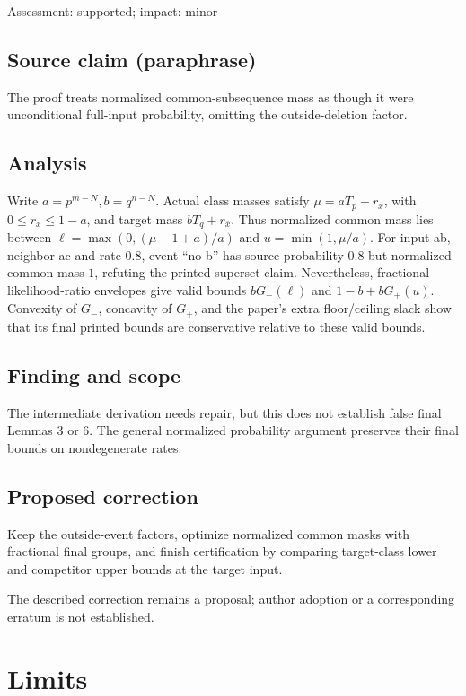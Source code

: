 \documentclass[11pt]{article}
\begin{document}
Assessment: supported; impact: minor

\subsection*{Source claim (paraphrase)}

The proof treats normalized common-subsequence mass as though it were unconditional full-input probability, omitting the outside-deletion factor.

\subsection*{Analysis}

Write \(a=p^{m-N},b=q^{n-N}\). Actual class masses satisfy \(\mu=aT_p+r_x\), with \(0\leq r_x\leq1-a\), and target mass \(bT_q+r_{\bar x}\). Thus normalized common mass lies between \(\ell=\max(0,(\mu-1+a)/a)\) and \(u=\min(1,\mu/a)\). For input ab, neighbor ac and rate \(0.8\), event “no b” has source probability \(0.8\) but normalized common mass \(1\), refuting the printed superset claim. Nevertheless, fractional likelihood-ratio envelopes give valid bounds \(bG_-(\ell)\) and \(1-b+bG_+(u)\). Convexity of \(G_-\), concavity of \(G_+\), and the paper’s extra floor/ceiling slack show that its final printed bounds are conservative relative to these valid bounds.

\subsection*{Finding and scope}

The intermediate derivation needs repair, but this does not establish false final Lemmas 3 or 6. The general normalized probability argument preserves their final bounds on nondegenerate rates.

\subsection*{Proposed correction}

Keep the outside-event factors, optimize normalized common masks with fractional final groups, and finish certification by comparing target-class lower and competitor upper bounds at the target input.

The described correction remains a proposal; author adoption or a corresponding erratum is not established.

\section*{Limits}
\end{document}
